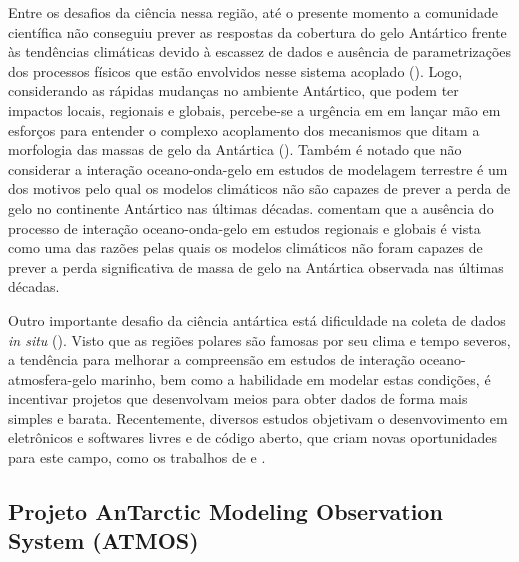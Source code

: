 \documentclass{article}
\begin{document}
Entre os desafios da ciência nessa região, até o presente momento a comunidade científica não conseguiu prever as respostas 
da cobertura do gelo Antártico frente às tendências climáticas devido à escassez de dados e ausência de parametrizações dos 
processos físicos que estão envolvidos nesse sistema acoplado (\cite{Turner2005}). Logo, considerando as rápidas mudanças 
no ambiente Antártico, que podem ter impactos locais, regionais e globais, percebe-se a urgência em em lançar mão 
em esforços para entender o complexo acoplamento dos mecanismos que ditam a morfologia das massas de gelo da Antártica 
(\cite{Mayewski2009}). Também é notado que não considerar a interação oceano-onda-gelo em estudos de modelagem terrestre 
é um dos motivos pelo qual os modelos climáticos não são capazes de prever a perda de gelo no continente Antártico nas últimas décadas. 
\textcite{Kohout2014} comentam que a ausência do processo de interação oceano-onda-gelo em estudos regionais e globais
é vista como uma das razões pelas quais os modelos climáticos não foram capazes de prever a perda significativa de 
massa de gelo na Antártica observada nas últimas décadas.

Outro importante desafio da ciência antártica está dificuldade na coleta de dados \textit{in situ} (\cite{Babanin2019}). 
Visto que as regiões polares são famosas por seu clima e tempo severos, a tendência para melhorar a compreensão em
estudos de interação oceano-atmosfera-gelo marinho, bem como a habilidade em modelar estas condições, é incentivar projetos que 
desenvolvam meios para obter dados de forma mais simples e barata. Recentemente, diversos estudos objetivam o desenvovimento em
eletrônicos e softwares livres e de código aberto, que criam novas oportunidades para este campo, como os trabalhos de 
\textcite{Rabault2017} e \textcite{Rabault2020}.


\subsection{Projeto AnTarctic Modeling Observation System (ATMOS)}
\bigskip
\end{document}

